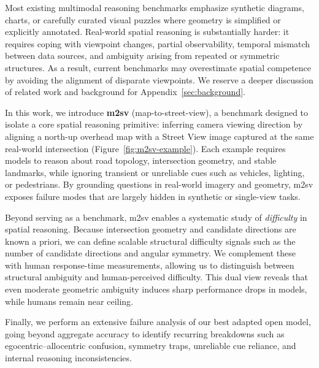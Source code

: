 \documentclass{article}
\begin{document}
Most existing multimodal reasoning benchmarks emphasize synthetic diagrams,
charts, or carefully curated visual puzzles where geometry is simplified or
explicitly annotated. Real-world spatial reasoning is substantially harder: it
requires coping with viewpoint changes, partial observability, temporal mismatch
between data sources, and ambiguity arising from repeated or symmetric structures.
As a result, current benchmarks may overestimate spatial competence by avoiding
the alignment of disparate viewpoints. We reserve a deeper discussion of related
work and background for Appendix~\ref{sec:background}.

In this work, we introduce \textbf{m2sv} (map-to-street-view), a benchmark designed
to isolate a core spatial reasoning primitive: inferring camera viewing direction
by aligning a north-up overhead map with a Street View image captured at the same
real-world intersection (Figure~\ref{fig:m2sv-example}). Each example requires
models to reason about road topology, intersection geometry, and stable landmarks,
while ignoring transient or unreliable cues such as vehicles, lighting, or
pedestrians. By grounding questions in real-world imagery and geometry, m2sv
exposes failure modes that are largely hidden in synthetic or single-view tasks.

Beyond serving as a benchmark, m2sv enables a systematic study of \emph{difficulty}
in spatial reasoning. Because intersection geometry and candidate directions are
known a priori, we can define scalable structural difficulty signals such as the
number of candidate directions and angular symmetry. We complement these with
human response-time measurements, allowing us to distinguish between structural
ambiguity and human-perceived difficulty. This dual view reveals that even
moderate geometric ambiguity induces sharp performance drops in models, while
humans remain near ceiling.

Finally, we perform an extensive failure analysis of our best adapted open model,
going beyond aggregate accuracy to identify recurring
breakdowns such as egocentric--allocentric confusion, symmetry traps, unreliable
cue reliance, and internal reasoning inconsistencies.
\end{document}
